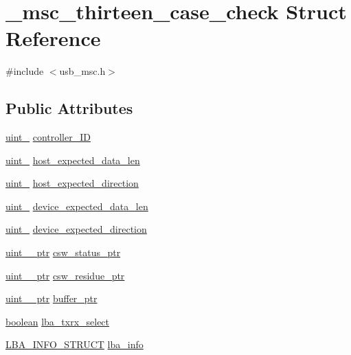 \hypertarget{struct__msc__thirteen__case__check}{}\section{\+\_\+msc\+\_\+thirteen\+\_\+case\+\_\+check Struct Reference}
\label{struct__msc__thirteen__case__check}


{\ttfamily \#include $<$usb\+\_\+msc.\+h$>$}

\subsection*{Public Attributes}
\begin{DoxyCompactItemize}
\item 
\hyperlink{types_8h_ad3209046c23f739a81581c10a4be7d92}{uint\+\_} \hyperlink{struct__msc__thirteen__case__check_ae07ea99144d5bf7eacb060c36e5bf493}{controller\+\_\+\+ID}
\item 
\hyperlink{types_8h_a5532400b872b4aa84e54335bf458a318}{uint\+\_} \hyperlink{struct__msc__thirteen__case__check_afb0d008e7ec831ea51b509e3625e0b18}{host\+\_\+expected\+\_\+data\+\_\+len}
\item 
\hyperlink{types_8h_ad3209046c23f739a81581c10a4be7d92}{uint\+\_} \hyperlink{struct__msc__thirteen__case__check_ace0a87fd7663bceff8088ee8113a1c9b}{host\+\_\+expected\+\_\+direction}
\item 
\hyperlink{types_8h_a5532400b872b4aa84e54335bf458a318}{uint\+\_} \hyperlink{struct__msc__thirteen__case__check_a01fb569bd95043806a1a4b2967874222}{device\+\_\+expected\+\_\+data\+\_\+len}
\item 
\hyperlink{types_8h_ad3209046c23f739a81581c10a4be7d92}{uint\+\_} \hyperlink{struct__msc__thirteen__case__check_a3c24304bde82044b8477e98566afb4b9}{device\+\_\+expected\+\_\+direction}
\item 
\hyperlink{types_8h_a7b968a76f3f622ee580e18acc3ab554c}{uint\+\_\+\_\+ptr} \hyperlink{struct__msc__thirteen__case__check_a7fa1920a1a743613eb776d409f7e5c53}{csw\+\_\+status\+\_\+ptr}
\item 
\hyperlink{types_8h_a3007b55e89a9521bba19c7c2cff4d09b}{uint\+\_\+\_\+ptr} \hyperlink{struct__msc__thirteen__case__check_a7c607fc22457f1511232851342cd99f1}{csw\+\_\+residue\+\_\+ptr}
\item 
\hyperlink{types_8h_a7b968a76f3f622ee580e18acc3ab554c}{uint\+\_\+\_\+ptr} \hyperlink{struct__msc__thirteen__case__check_ab2ad98f0b7e97ae3a834820f84271289}{buffer\+\_\+ptr}
\item 
\hyperlink{types_8h_a7670a4e8a07d9ebb00411948b0bbf86d}{boolean} \hyperlink{struct__msc__thirteen__case__check_a036fae97f8ea1ff3fe0d3cdaaeb3a7ee}{lba\+\_\+txrx\+\_\+select}
\item 
\hyperlink{usb__msc_8h_a4ab4c0c61ffc1930c00d2d1bc05504b1}{L\+B\+A\+\_\+\+I\+N\+F\+O\+\_\+\+S\+T\+R\+U\+CT} \hyperlink{struct__msc__thirteen__case__check_adf0678cc97557349cfed3e5be2ffe99b}{lba\+\_\+info}
\end{DoxyCompactItemize}


